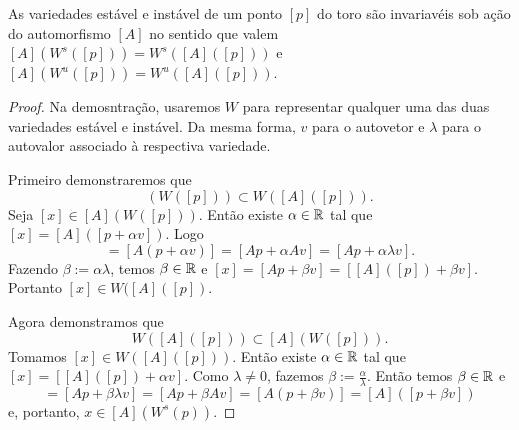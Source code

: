 \begin{proposition}
As variedades estável e instável de um ponto $[p]$ do toro são invariavéis sob ação do automorfismo $[A]$ no sentido que valem $[A](W^s([p])) = W^s([A]([p]))$ e $[A](W^u([p])) = W^u([A]([p]))$.
	\end{proposition}
\begin{proof}
	Na demosntração, usaremos $W$ para representar qualquer uma das duas variedades estável e instável. Da mesma forma, $v$ para o autovetor e $\lambda$ para o autovalor associado à respectiva variedade.

	Primeiro demonstraremos que
		\begin{equation*}
		[A](W([p])) \subset W([A]([p])).
		\end{equation*}
Seja $[x] \in [A](W([p]))$. Então existe $\alpha \in \mathbb{R}$ tal que $[x] = [A]([p + \alpha v])$. Logo
	\begin{equation*}
	[x] = [A(p + \alpha v)] = [Ap + \alpha Av] = [Ap + \alpha \lambda v].
	\end{equation*}
Fazendo $\beta := \alpha \lambda$, temos $\beta \in \mathbb{R}$ e $[x] = [Ap + \beta v] = [[A]([p]) + \beta v]$. Portanto $[x] \in W([A]([p])$.

	Agora demonstramos que
		\begin{equation*}
		W([A]([p])) \subset [A](W([p])).
		\end{equation*}
Tomamos $[x] \in W([A]([p]))$. Então existe $\alpha \in \mathbb{R}$ tal que $[x] = [[A]([p]) + \alpha v]$. Como $\lambda \neq 0$, fazemos $\beta := \frac{\alpha}{\lambda}$. Então temos $\beta \in \mathbb{R}$ e
	\begin{equation*}
	[x] = [Ap + \beta \lambda v] = [Ap + \beta Av] = [A(p + \beta v)] = [A]([p + \beta v])
		\end{equation*}
e, portanto, $x \in [A](W^s(p))$.
	\end{proof}

